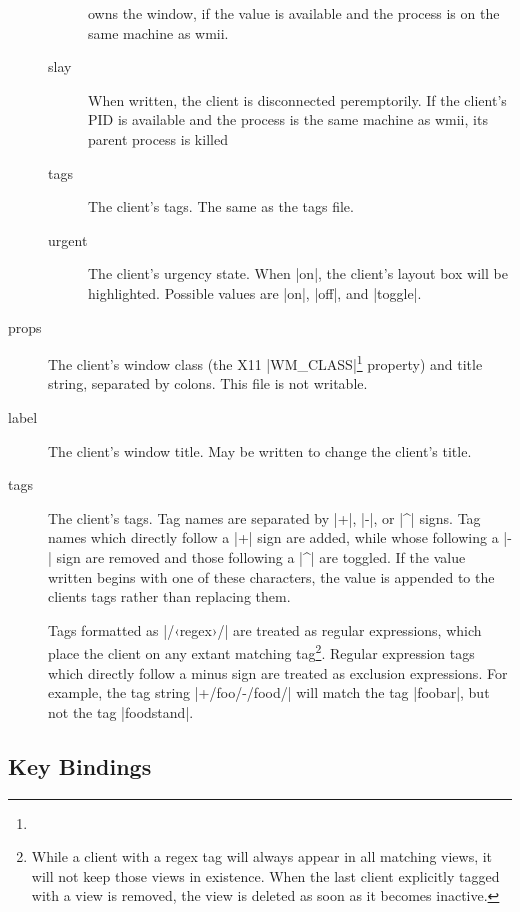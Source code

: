 \begin{description}
\begin{description}
        owns the window, if the value is available and the
        process is on the same machine as wmii.
      \item[slay] When written, the client is disconnected
        peremptorily. If the client's PID is available and the
        process is the same machine as wmii, its parent process
        is killed
      \item[tags] The client's tags. The same as the tags file.
      \item[urgent] The client's urgency state. When |on|, the
        client's layout box will be highlighted. Possible values
        are |on|, |off|, and |toggle|.
    \end{description}
  \item[props] The client's window class (the X11
    |WM_CLASS|\footnote{}
    property) and title string, separated by colons. This file
    is not writable.
  \item[label] The client's window title. May be written to
    change the client's title.
  \item[tags]
    The client's tags. Tag names are separated by |+|, |-|, or
    |^| signs. Tag names which directly follow a |+| sign are
    added, while whose following a |-| sign are removed and
    those following a |^| are toggled.  If the value written
    begins with one of these characters, the value is appended
    to the clients tags rather than replacing them. 
    
    Tags formatted as |/‹regex›/| are treated as regular
    expressions, which place the client on any extant matching
    tag\footnote{While a client with a regex tag will always
    appear in all matching views, it will not keep those views
    in existence. When the last client explicitly tagged with a
    view is removed, the view is deleted as soon as it becomes
    inactive.}.  Regular expression tags which directly follow a
    minus sign are treated as exclusion expressions. For
    example, the tag string |+/foo/-/food/| will match the tag
    |foobar|, but not the tag |foodstand|.
\end{description}


\subsection{Key Bindings}

